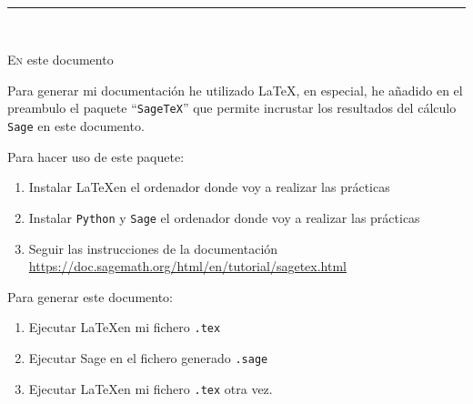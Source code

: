
\begin{center}
	{\fboxrule=4pt } \\
	\rule{15cm}{0pt} \\
\end{center}

 
\lettrine[lines=3, depth = 0]{E}{n} este documento

\par Para generar mi documentación he utilizado \LaTeX, en especial, he añadido
 en el preambulo el paquete ``\texttt{Sage\TeX}'' que permite incrustar los
 resultados del cálculo \texttt{Sage} en este documento.
\par Para hacer uso de este paquete:
\begin{enumerate}
	\item Instalar \LaTeX en el ordenador donde voy a realizar las prácticas
 	\item Instalar \texttt{Python} y \texttt{Sage} el ordenador donde voy a realizar las prácticas
  	\item Seguir las instrucciones de la documentación \url{https://doc.sagemath.org/html/en/tutorial/sagetex.html}
\end{enumerate}
\par Para generar este documento:
\begin{enumerate}
	\item Ejecutar \LaTeX en mi fichero \texttt{.tex}
 	\item Ejecutar Sage en el fichero generado \texttt{.sage}
  	\item Ejecutar \LaTeX en mi fichero \texttt{.tex} otra vez.
\end{enumerate}


\newpage
{}